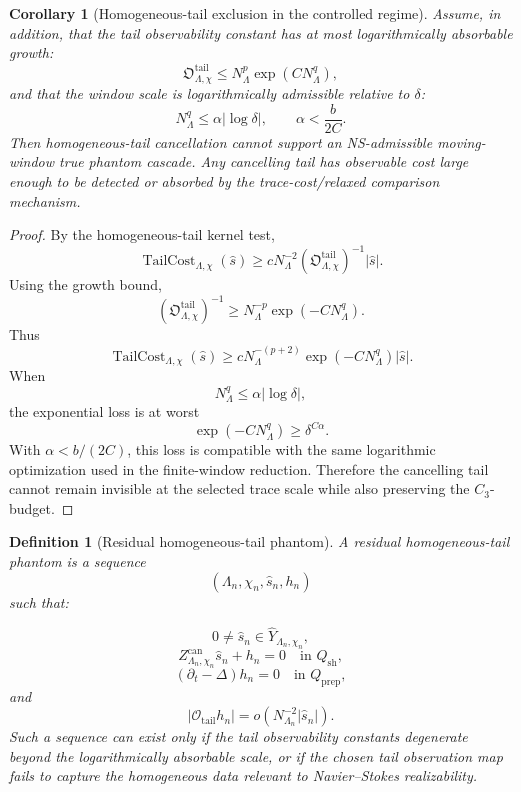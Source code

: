 \documentclass[11pt]{article}
\numberwithin{equation}{section}
\newtheorem{corollary}[theorem]{Corollary}
\newtheorem{definition}[theorem]{Definition}
\begin{document}
\begin{corollary}[Homogeneous-tail exclusion in the controlled regime]
Assume, in addition, that the tail observability constant has at most logarithmically absorbable growth:
\begin{equation}
\mathfrak O_{\Lambda,\chi}^{\mathrm{tail}}
\le
N_\Lambda^p\exp(CN_\Lambda^q),
\label{eq:tag-10-232}
\end{equation}
and that the window scale is logarithmically admissible relative to \(\delta\):
\begin{equation}
N_\Lambda^q\le \alpha|\log\delta|,
\qquad
\alpha<\frac{b}{2C}.
\label{eq:tag-10-233}
\end{equation}
Then homogeneous-tail cancellation cannot support an NS-admissible moving-window true phantom cascade. Any cancelling tail has observable cost large enough to be detected or absorbed by the trace-cost/relaxed comparison mechanism.
\end{corollary}

\begin{proof}
By the homogeneous-tail kernel test,
\[
\operatorname{TailCost}_{\Lambda,\chi}(\widehat s)
\ge
c
N_\Lambda^{-2}
\left(\mathfrak O_{\Lambda,\chi}^{\mathrm{tail}}\right)^{-1}
|\widehat s|.
\]
Using the growth bound,
\[
\left(\mathfrak O_{\Lambda,\chi}^{\mathrm{tail}}\right)^{-1}
\ge
N_\Lambda^{-p}\exp(-CN_\Lambda^q).
\]
Thus
\[
\operatorname{TailCost}_{\Lambda,\chi}(\widehat s)
\ge
cN_\Lambda^{-(p+2)}
\exp(-CN_\Lambda^q)
|\widehat s|.
\]
When
\[
N_\Lambda^q\le \alpha|\log\delta|,
\]
the exponential loss is at worst
\[
\exp(-CN_\Lambda^q)
\ge
\delta^{C\alpha}.
\]
With \(\alpha<b/(2C)\), this loss is compatible with the same logarithmic optimization used in the finite-window reduction. Therefore the cancelling tail cannot remain invisible at the selected trace scale while also preserving the \(C_3\)-budget.
\end{proof}

\begin{definition}[Residual homogeneous-tail phantom]
A residual homogeneous-tail phantom is a sequence
\[
(\Lambda_n,\chi_n,\widehat s_n,h_n)
\]
such that:

\[
0\neq \widehat s_n\in\widehat Y_{\Lambda_n,\chi_n},
\]
\[
Z_{\Lambda_n,\chi_n}^{\mathrm{can}}\widehat s_n+h_n=0
\quad
\text{in }Q_{\mathrm{sh}},
\]
\[
(\partial_t-\Delta)h_n=0
\quad
\text{in }Q_{\mathrm{prep}},
\]
and
\begin{equation}
|\mathcal O_{\mathrm{tail}}h_n|
=o\!\left(
N_{\Lambda_n}^{-2}|\widehat s_n|
\right).
\label{eq:tag-10-234}
\end{equation}
Such a sequence can exist only if the tail observability constants degenerate beyond the logarithmically absorbable scale, or if the chosen tail observation map fails to capture the homogeneous data relevant to Navier--Stokes realizability.
\end{definition}
\end{document}
